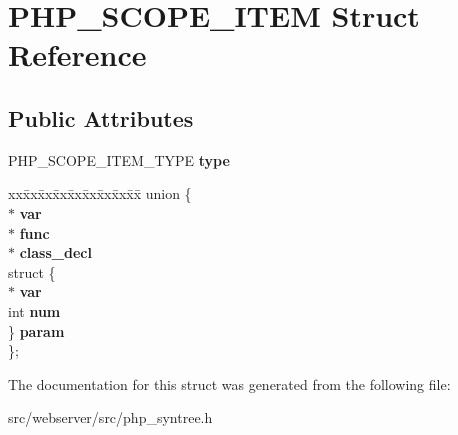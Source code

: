 \section{PHP\_\-SCOPE\_\-ITEM Struct Reference}
\label{structPHP__SCOPE__ITEM}
\subsection*{Public Attributes}
\begin{DoxyCompactItemize}
\item 
PHP\_\-SCOPE\_\-ITEM\_\-TYPE {\bfseries type}\label{structPHP__SCOPE__ITEM_ac82b1d81b0b67106ac3ffff39d640ede}

\item 
\begin{tabbing}
xx\=xx\=xx\=xx\=xx\=xx\=xx\=xx\=xx\=\kill
union \{\\
 $\ast$ {\bfseries var}\\
 $\ast$ {\bfseries func}\\
 $\ast$ {\bfseries class\_decl}\\
\>struct \{\\
\> $\ast$ {\bfseries var}\\
\>\>int {\bfseries num}\\
\>\} {\bfseries param}\\
\}; \label{structPHP__SCOPE__ITEM_ae061f5ba558ae5c62d5b8bc518da0655}
\\

\end{tabbing}\end{DoxyCompactItemize}


The documentation for this struct was generated from the following file:\begin{DoxyCompactItemize}
\item 
src/webserver/src/php\_\-syntree.h\end{DoxyCompactItemize}
